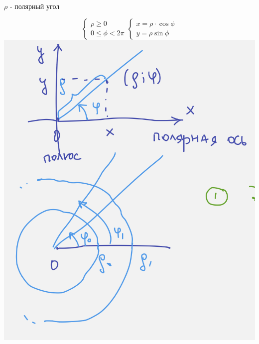 \documentclass{article}
\begin{document}
$\rho$ - полярный угол

\begin{equation*}
    \begin{cases}
        \rho \geq 0 \\
        0\leq \phi < 2\pi
    \end{cases}
    \begin{cases}
        x=\rho\cdot \cos \phi\\
        y = \rho \sin \phi
    \end{cases}
\end{equation*}
\includegraphics[width=.3\textwidth]{psk} 
\end{document}
